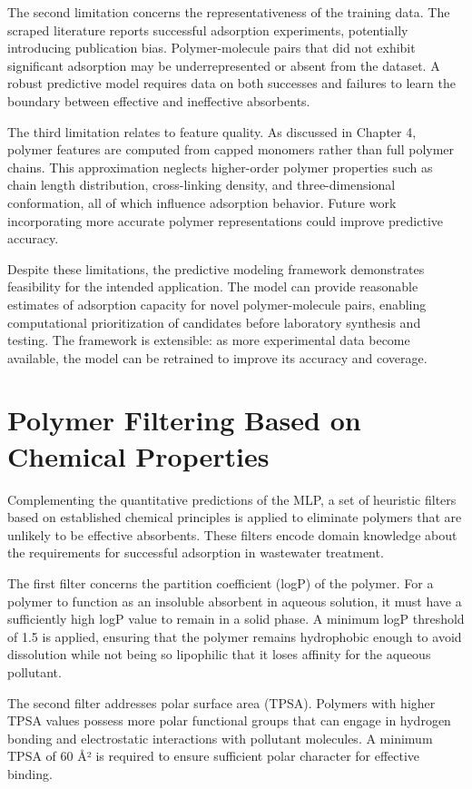 The second limitation concerns the representativeness of the training data. The scraped literature reports successful adsorption experiments, potentially introducing publication bias. Polymer-molecule pairs that did not exhibit significant adsorption may be underrepresented or absent from the dataset. A robust predictive model requires data on both successes and failures to learn the boundary between effective and ineffective absorbents.

The third limitation relates to feature quality. As discussed in Chapter 4, polymer features are computed from capped monomers rather than full polymer chains. This approximation neglects higher-order polymer properties such as chain length distribution, cross-linking density, and three-dimensional conformation, all of which influence adsorption behavior. Future work incorporating more accurate polymer representations could improve predictive accuracy.

Despite these limitations, the predictive modeling framework demonstrates feasibility for the intended application. The model can provide reasonable estimates of adsorption capacity for novel polymer-molecule pairs, enabling computational prioritization of candidates before laboratory synthesis and testing. The framework is extensible: as more experimental data become available, the model can be retrained to improve its accuracy and coverage.

\section{Polymer Filtering Based on Chemical Properties}
\label{sec:polymer_filtering}

Complementing the quantitative predictions of the MLP, a set of heuristic filters based on established chemical principles is applied to eliminate polymers that are unlikely to be effective absorbents. These filters encode domain knowledge about the requirements for successful adsorption in wastewater treatment.

The first filter concerns the partition coefficient (logP) of the polymer. For a polymer to function as an insoluble absorbent in aqueous solution, it must have a sufficiently high logP value to remain in a solid phase. A minimum logP threshold of 1.5 is applied, ensuring that the polymer remains hydrophobic enough to avoid dissolution while not being so lipophilic that it loses affinity for the aqueous pollutant.

The second filter addresses polar surface area (TPSA). Polymers with higher TPSA values possess more polar functional groups that can engage in hydrogen bonding and electrostatic interactions with pollutant molecules. A minimum TPSA of 60 \r{A}² is required to ensure sufficient polar character for effective binding.

